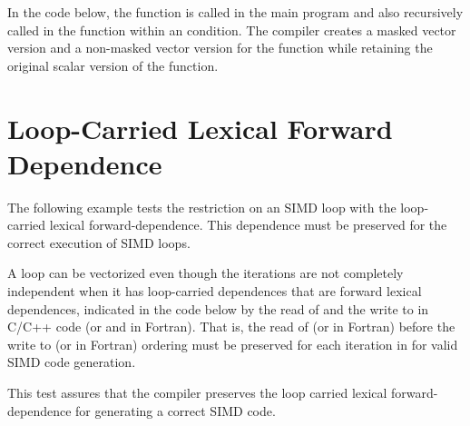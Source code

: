 


In the code below, the function  is called in the main program and 
also recursively called in the function  within an  
condition. The compiler creates a masked vector version and a non-masked vector 
version for the function  while retaining the original scalar 
version of the  function.





\pagebreak
\section{Loop-Carried Lexical Forward Dependence}
\label{sec:SIMD_forward_dep}


 The following example tests the restriction on an SIMD loop with the loop-carried lexical forward-dependence. This dependence must be preserved for the correct execution of SIMD loops.

A loop can be vectorized even though the iterations are not completely independent when it has loop-carried dependences that are forward lexical dependences, indicated in the code below by the read of  and the write to  in C/C++ code (or  and  in Fortran). That is, the read of  (or  in Fortran) before the write to  (or  in Fortran) ordering must be preserved for each iteration in  for valid SIMD code generation.

This test assures that the compiler preserves the loop carried lexical forward-dependence for generating a correct SIMD code.



